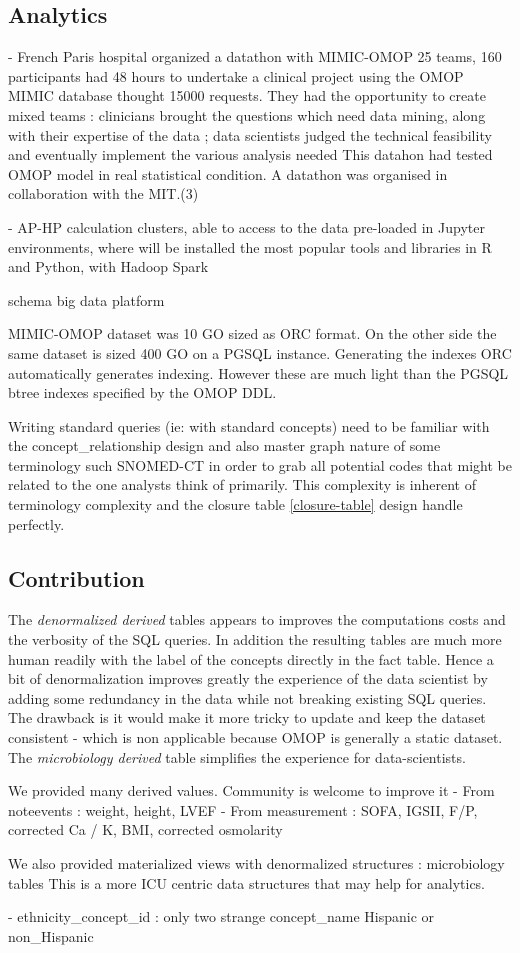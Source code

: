 \subsection{Analytics}

- French Paris hospital organized a datathon with MIMIC-OMOP
25 teams, 160 participants had 48 hours to undertake a clinical project using the OMOP MIMIC database thought 15000 requests. They had the opportunity to create mixed teams : clinicians brought the questions which need data mining, along with their expertise of the data ; data scientists judged the technical feasibility and eventually implement the various analysis needed
This datahon had tested OMOP model in real statistical condition. A datathon was organised in collaboration with the MIT.(3)

- AP-HP calculation clusters, able to access to the data pre-loaded in Jupyter environments, where will be installed the most popular tools and libraries in R and Python, with Hadoop Spark

schema big data platform

MIMIC-OMOP dataset was 10 GO sized as ORC format. On the other side the same
dataset is sized 400 GO on a PGSQL instance. Generating the indexes
ORC automatically generates indexing. However these are much light than the
PGSQL btree indexes specified by the OMOP DDL.

Writing standard queries (ie: with standard concepts) need to be familiar with
the concept\_relationship design and also master graph nature of some
terminology such SNOMED-CT in order to grab all potential codes that might be
related to the one analysts think of primarily. This complexity is inherent of
terminology complexity and the closure table \ref{closure-table} design handle
perfectly.

\subsection{Contribution}

The \emph{denormalized derived} tables appears to improves the computations
costs and the verbosity of the SQL queries. In addition the resulting tables
are much more human readily with the label of the concepts directly in the fact
table. Hence a bit of denormalization improves greatly the experience of the
data scientist by adding some redundancy in the data while not breaking
existing SQL queries. The drawback is it would make it more tricky to update
and keep the dataset consistent - which is non applicable because OMOP is
generally a static dataset.
The \emph{microbiology derived} table simplifies the experience for
data-scientists.

We provided many derived values. Community is welcome to improve it
- From noteevents : weight, height, LVEF
- From measurement : SOFA, IGSII, F/P, corrected Ca / K, BMI, corrected osmolarity

We also provided materialized views with denormalized structures : microbiology tables
This is a more ICU centric data structures that may help for analytics.


- ethnicity\_concept\_id : only two strange concept\_name Hispanic or non\_Hispanic
